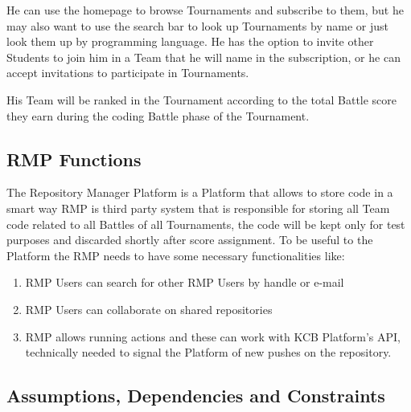 He can use the homepage to browse Tournaments and subscribe to them, but he may also want to use the search bar to look up Tournaments by name or just look them up by programming language. He has the option to invite other Students
to join him in a Team that he will name in the subscription, or he can accept invitations to participate in Tournaments.

His Team will be ranked in the Tournament according to the total Battle score they earn during the coding Battle phase of the Tournament.

\subsection{RMP Functions}
The Repository Manager Platform is a Platform that allows to store code in a smart way
RMP is third party system that is responsible for storing all Team code related to all Battles of all Tournaments, the code will be kept only for test purposes and discarded shortly after score assignment. 
To be useful to the Platform the RMP needs to have some necessary functionalities like:
\begin{enumerate}
    \item RMP Users can search for other RMP Users by handle or e-mail
    \item RMP Users can collaborate on shared repositories
    \item RMP allows running actions and these can work with KCB Platform's API, technically needed to signal the Platform of new pushes on the repository.
\end{enumerate}

\subsection{Assumptions, Dependencies and Constraints}
